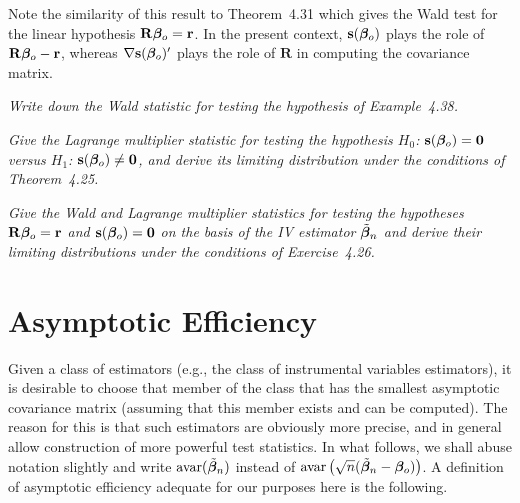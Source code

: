 Note the similarity of this result to Theorem~4.31 which gives the Wald
test for the linear hypothesis $\mathbf{R}\boldsymbol{\beta}_o = \mathbf{r}$. In the present context, $\mathbf{s}(\boldsymbol{\beta}_o)$ plays
the role of $\mathbf{R}\boldsymbol{\beta}_o - \mathbf{r}$, whereas $\nabla \mathbf{s}(\boldsymbol{\beta}_o)'$ plays the role of $\mathbf{R}$ in computing the
covariance matrix.

\begin{exercises}
\item\label{ex:4.40} \textit{Write down the Wald statistic for testing the hypothesis of
Example~4.38.}

\item\label{ex:4.41} \textit{Give the Lagrange multiplier statistic for testing the hypothesis $H_0$: $\mathbf{s}(\boldsymbol{\beta}_o) = \mathbf{0}$ versus $H_1$: $\mathbf{s}(\boldsymbol{\beta}_o) \neq \mathbf{0}$, and derive its limiting distribution under the conditions of Theorem~4.25.}

\item\label{ex:4.42} \textit{Give the Wald and Lagrange multiplier statistics for testing
the hypotheses $\mathbf{R}\boldsymbol{\beta}_o = \mathbf{r}$ and $\mathbf{s}(\boldsymbol{\beta}_o) = \mathbf{0}$ on the basis of the IV estimator $\tilde{\boldsymbol{\beta}}_n$ and derive their limiting distributions under the conditions of Exercise~4.26.}
\end{exercises}

\section{Asymptotic Efficiency}\label{sec:asymptotic-efficiency}

Given a class of estimators (e.g., the class of instrumental variables estimators), it is desirable to choose that member of the class that has the
smallest asymptotic covariance matrix (assuming that this member exists
and can be computed). The reason for this is that such estimators are obviously more precise, and in general allow construction of more powerful
test statistics. In what follows, we shall abuse notation slightly and write
$\mathrm{avar}(\tilde{\boldsymbol{\beta}}_n)$ instead of $\mathrm{avar}\left(\sqrt{n}(\tilde{\boldsymbol{\beta}}_n - \boldsymbol{\beta}_o)\right)$. A definition of asymptotic efficiency adequate for our purposes here is the following.


